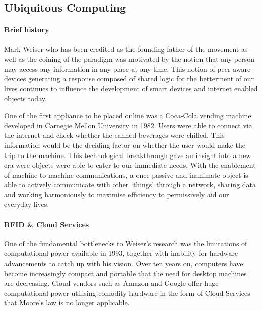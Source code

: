 \documentclass[a4paper, 11pt]{article}
\begin{document}
{\vspace{\baselineskip}
\vspace{\baselineskip}
\vspace{\baselineskip}

\subsection{Ubiquitous Computing}

\paragraph{Brief history} Mark Weiser who has been credited as the founding father of the movement as well as the coining of the paradigm was motivated by the notion that any person may access any information in any place at any time.\cite{weiser} This notion of peer aware devices generating a response composed of shared logic for the betterment of our lives continues to influence the development of smart devices and internet enabled objects today.  

One of the first appliance to be placed online was a Coca-Cola vending machine developed in Carnegie Mellon University in 1982. Users were able to connect via the internet and check whether the canned beverages were chilled. This information would be the deciding factor on whether the user would make the trip to the machine. This technological breakthrough gave an insight into a new era were objects were able to cater to our immediate needs. With the enablement of machine to machine communications, a once passive and inanimate object is able to actively communicate with other `things' through a network, sharing data and working harmoniously to maximise efficiency to permissively aid our everyday lives.

\paragraph{RFID \& Cloud Services}One of the fundamental bottlenecks to Weiser's research was the limitations of computational power available in 1993\cite{weiserLimit}, together with inability for hardware advancements to catch up with his vision. Over ten years on, computers have become increasingly compact and portable that the need for desktop machines are decreasing. Cloud vendors such as Amazon and Google offer huge computational power utilising comodity hardware in the form of Cloud Services that Moore's law is no longer applicable\cite{HadoopInAction}. 

}
\end{document}
